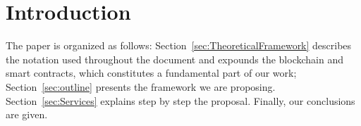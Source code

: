 \section{Introduction}



The paper is organized as follows: 
Section~\ref{sec:TheoreticalFramework} describes the notation used 
throughout the document and expounds the blockchain and smart contracts, 
which constitutes a fundamental part of our work; 
Section~\ref{sec:outline} presents the framework we are proposing. 
Section~\ref{sec:Services} explains step by step the proposal.
Finally, our conclusions are given.